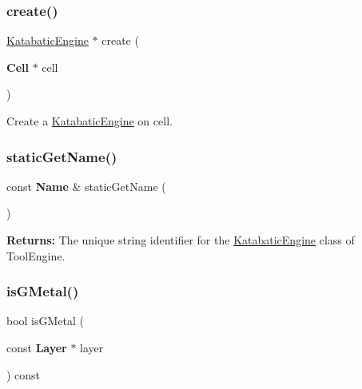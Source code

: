\subsubsection{\texorpdfstring{create()}{create()}}
{\footnotesize\ttfamily \mbox{\hyperlink{classKatabatic_1_1KatabaticEngine}{Katabatic\+Engine}} $\ast$ create (\begin{DoxyParamCaption}\item[{\textbf{ Cell} $\ast$}]{cell }\end{DoxyParamCaption})\hspace{0.3cm}{\ttfamily [static]}}

Create a \mbox{\hyperlink{classKatabatic_1_1KatabaticEngine}{Katabatic\+Engine}} on {\ttfamily cell}. \mbox{\label{classKatabatic_1_1KatabaticEngine_a802eee6265da8d536db52d412f8a4afd}} 
\subsubsection{\texorpdfstring{static\+Get\+Name()}{staticGetName()}}
{\footnotesize\ttfamily const \textbf{ Name} \& static\+Get\+Name (\begin{DoxyParamCaption}{ }\end{DoxyParamCaption})\hspace{0.3cm}{\ttfamily [static]}}

{\bfseries Returns\+:} The unique string identifier for the \mbox{\hyperlink{classKatabatic_1_1KatabaticEngine}{Katabatic\+Engine}} class of Tool\+Engine. \mbox{\label{classKatabatic_1_1KatabaticEngine_a83a7793270669d2669222eac2caa7f93}} 
\subsubsection{\texorpdfstring{is\+G\+Metal()}{isGMetal()}}
{\footnotesize\ttfamily bool is\+G\+Metal (\begin{DoxyParamCaption}\item[{const \textbf{ Layer} $\ast$}]{layer }\end{DoxyParamCaption}) const\hspace{0.3cm}{\ttfamily [inline]}}

